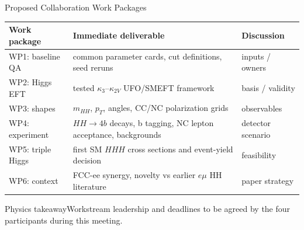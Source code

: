 \documentclass[aspectratio=1610,english]{beamer}
\newcommand{\src}[1]{\vfill{\par\color{black!65}\fontsize{6.4}{7.4}\selectfont\emph{Source:} #1\par}}
\newcommand{\key}[1]{\begin{alertblock}{Physics takeaway}\small  #1\end{alertblock}}
\begin{document}
\begin{frame}[t]{Proposed Collaboration Work Packages}
\footnotesize

\begin{center}\setlength{\tabcolsep}{4pt}\renewcommand{\arraystretch}{1.03}
\begin{tabular}{p{2.25cm}p{6.0cm}p{2.5cm}}\toprule
Work package & Immediate deliverable & Discussion\\\midrule
WP1: baseline QA & common parameter cards, cut definitions, seed reruns & inputs / owners\\
WP2: Higgs EFT & tested $\kappa_3$--$\kappa_{2V}$ UFO/SMEFT framework & basis / validity\\
WP3: shapes & $m_{HH}$, $p_T$, angles, CC/NC polarization grids & observables\\
WP4: experiment & $HH\to4b$ decays, b tagging, NC lepton acceptance, backgrounds & detector scenario\\
WP5: triple Higgs & first SM $HHH$ cross sections and event-yield decision & feasibility\\
WP6: context & FCC-ee synergy, novelty vs earlier $e\mu$ HH literature & paper strategy\\\bottomrule
\end{tabular}\end{center}
\key{Workstream leadership and deadlines to be agreed by the four participants during this meeting.}

\end{frame}
\end{document}
